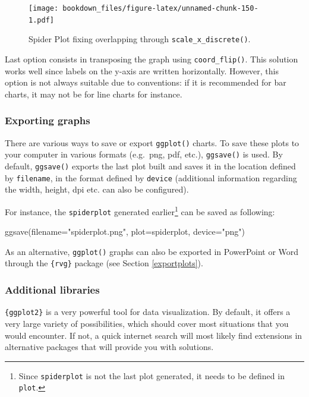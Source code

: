 \documentclass[
]{krantz}
\makeatletter
\newenvironment{Shaded}{\begin{snugshade}}{\end{snugshade}}
\newcommand{\AttributeTok}[1]{\textcolor[rgb]{0.61,0.61,0.61}{#1}}
\newcommand{\FunctionTok}[1]{\textcolor[rgb]{0,0,0}{#1}}
\newcommand{\NormalTok}[1]{#1}
\newcommand{\StringTok}[1]{\textcolor[rgb]{0.5,0.5,0.5}{#1}}
\newenvironment{kframe}{%
\medskip{}
\setlength{\fboxsep}{.8em}
 \def\at@end@of@kframe{}%
 \ifinner\ifhmode%
  \def\at@end@of@kframe{\end{minipage}}%
  \begin{minipage}{\columnwidth}%
 \fi\fi%
 \def\FrameCommand##1{\hskip\@totalleftmargin \hskip-\fboxsep
 \colorbox{shadecolor}{##1}\hskip-\fboxsep
     \hskip-\linewidth \hskip-\@totalleftmargin \hskip\columnwidth}%
 \MakeFramed {\advance\hsize-\width
   \@totalleftmargin\z@ \linewidth\hsize
   \@setminipage}}%
 {\par\unskip\endMakeFramed%
 \at@end@of@kframe}
\renewenvironment{Shaded}{\begin{kframe}}{\end{kframe}}
\makeatother
\begin{document}
\begin{figure}
\centering
\texttt{[image: bookdown\_files/figure-latex/unnamed-chunk-150-1.pdf]}
\caption{\label{fig:unnamed-chunk-150}Spider Plot fixing overlapping through \texttt{scale\_x\_discrete()}.}
\end{figure}

Last option consists in transposing the graph using \texttt{coord\_flip()}. This solution works well since labels on the y-axis are written horizontally. However, this option is not always suitable due to conventions: if it is recommended for bar charts, it may not be for line charts for instance.

\hypertarget{export}{%
\subsubsection*{Exporting graphs}\label{export}}


There are various ways to save or export \texttt{ggplot()} charts. To save these plots to your computer in various formats (e.g.~png, pdf, etc.), \texttt{ggsave()} is used. By default, \texttt{ggsave()} exports the last plot built and saves it in the location defined by \texttt{filename}, in the format defined by \texttt{device} (additional information regarding the width, height, dpi etc. can also be configured).

For instance, the \texttt{spiderplot} generated earlier\footnote{Since \texttt{spiderplot} is not the last plot generated, it needs to be defined in \texttt{plot}.} can be saved as following:

\begin{Shaded}
\begin{Highlighting}[]
\FunctionTok{ggsave}\NormalTok{(}\AttributeTok{filename=}\StringTok{"spiderplot.png"}\NormalTok{, }\AttributeTok{plot=}\NormalTok{spiderplot, }\AttributeTok{device=}\StringTok{"png"}\NormalTok{)}
\end{Highlighting}
\end{Shaded}

As an alternative, \texttt{ggplot()} graphs can also be exported in PowerPoint or Word through the \texttt{\{rvg\}} package (see Section \ref{exportplots}).

\hypertarget{additional}{%
\subsubsection*{Additional libraries}\label{additional}}


\texttt{\{ggplot2\}} is a very powerful tool for data visualization. By default, it offers a very large variety of possibilities, which should cover most situations that you would encounter. If not, a quick internet search will most likely find extensions in alternative packages that will provide you with solutions.
\end{document}
